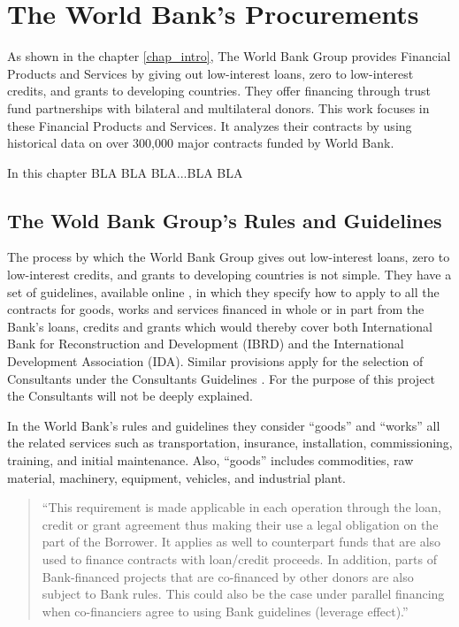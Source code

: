 \chapter{The World Bank's Procurements}\label{chap_procurements}

As shown in the chapter \ref{chap_intro}, The World Bank Group provides Financial Products and Services by giving out low-interest loans, zero to low-interest credits, and grants to developing countries. They offer financing through trust fund partnerships with bilateral and multilateral donors.  This work focuses in these Financial Products and Services. It analyzes their contracts by using historical data on over 300,000 major contracts funded by World Bank.

In this chapter BLA BLA BLA...BLA BLA

\section{The Wold Bank Group's Rules and Guidelines}

The process by which the World Bank Group gives out low-interest loans, zero to low-interest credits, and grants to developing countries is not simple. They have a set of guidelines, available online \parencite{wb_g_proc}, in which they specify how to apply to all the contracts for goods, works and services financed in whole or in part from the Bank's loans, credits and grants which would thereby cover both International Bank for Reconstruction and Development (IBRD) and the International Development Association (IDA). Similar provisions apply for the selection of Consultants under the Consultants Guidelines \parencite{wb_g_cons}. For the purpose of this project the Consultants will not be deeply explained. 

In the World Bank's rules and guidelines they consider ``goods'' and ``works'' all the related services such as transportation, insurance, installation, commissioning, training, and initial maintenance. Also,  ``goods'' includes commodities, raw material, machinery, equipment, vehicles, and industrial plant. 

\begin{quote}
``This requirement is made applicable in each operation through the loan, credit or grant agreement thus making their use a legal obligation on the part of the Borrower. It applies as well to counterpart funds that are also used to finance contracts with loan/credit proceeds. In addition, parts of Bank-financed projects that are co-financed by other donors are also subject to Bank rules. This could also be the case under parallel financing when co-financiers agree to using Bank guidelines (leverage effect).''\parencite{wb_rules}
\end{quote}

